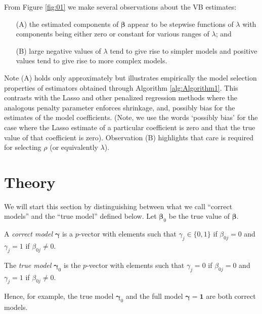 \documentclass[11pt]{article}
\newtheorem{Main Result}{Main Result}
\def\vectorfonttwo{\boldsymbol}
\def\vbeta{{\vectorfonttwo \beta}}               %
\def\vgamma{{\vectorfonttwo \gamma}}             %
\newcommand{\joc}[1]{{\color{black}#1}}
\begin{document}
From Figure \ref{fig:01} we make several observations about the VB estimates:
\begin{enumerate}
\item[(A)] the estimated components of $\vbeta$ appear to be stepwise functions
of $\lambda$ with components being either zero or constant for various ranges of
$\lambda$; and

\item[(B)] large negative values of $\lambda$ tend to give rise to simpler
models and positive values tend to give rise to more complex models.
\end{enumerate}

\noindent Note (A) holds only approximately but illustrates empirically the model selection properties of
estimators obtained through
Algorithm \ref{alg:Algorithm1}. This contrasts with the Lasso
and other penalized regression methods where the analogous
penalty parameter enforces shrinkage, and, possibly bias for the estimates of
the model coefficients. \joc{(Note, we use the words `possibly bias' for the
case where the Lasso estimate of a particular coefficient is zero and that 
the true value of that coefficient is zero).} Observation (B) highlights that care is required for selecting
$\rho$ (or equivalently $\lambda$).

\section{Theory}\label{sec:Main Results}

\joc{
We will start this section by distinguishing between what we call ``correct models''
and the ``true model'' defined below. Let $\vbeta_0$ be the true value of $\vbeta$.
 
\noindent {\bf Definition 1:} A {\it correct model} $\vgamma$ is a $p$-vector with elements
such that $\gamma_{j}\in \{0,1\}$ if $\beta_{0j}= 0$ and $\gamma_{j}=1$ if $\beta_{0j}\ne 0$.
	
\medskip
\noindent {\bf Definition 2:} The {\it true model} $\vgamma_0$ is the $p$-vector with elements
such that $\gamma_{j}=0$ if $\beta_{0j}= 0$ and $\gamma_{j}=1$ if $\beta_{0j}\ne 0$.
	
\smallskip
\noindent
Hence, for example, the true model $\vgamma_0$ and the full model
$\vgamma=\mathbf{1}$ are both correct models.}
\end{document}
